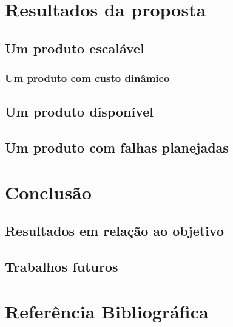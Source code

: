 \documentclass[]{../class/politex}
\begin{document}
  \chapter{Resultados da proposta}

    \section{Um produto escalável}

      \subsection{Um produto com custo dinâmico}

    \section{Um produto disponível}

    \section{Um produto com falhas planejadas}

  \chapter{Conclusão}

    \section{Resultados em relação ao objetivo}

    \section{Trabalhos futuros}

  \chapter{Referência Bibliográfica}
\end{document}
